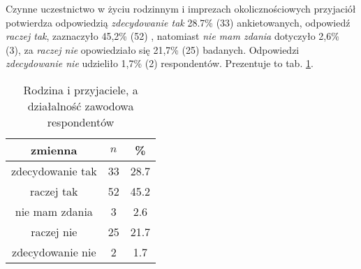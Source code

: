 
Czynne uczestnictwo w życiu rodzinnym i imprezach okolicznościowych przyjaciół potwierdza odpowiedzią \textit{zdecydowanie tak}  28.7\%   (33) ankietowanych, odpowiedź \textit{raczej tak},  zaznaczyło 45,2\% (52) , natomiast \textit{nie mam zdania} dotyczyło 2,6\% (3), za \textit{raczej nie} opowiedziało się  21,7\% (25) badanych. Odpowiedzi \textit{zdecydowanie nie} udzieliło 1,7\% (2) respondentów. Prezentuje to tab.  \ref{tab:Q24}.
\begin{table}[H]
\caption{Rodzina i przyjaciele, a działalność zawodowa respondentów}
\centering
\begin{tabular}{ | c | c | c |}
\hline
zmienna & $n$ & \% \\
\hline
zdecydowanie tak  &  33  & 28.7 \\
\hline
raczej tak  &  52  & 45.2\\
\hline
nie mam zdania  &  3  & 2.6\\
\hline
raczej nie  &  25  & 21.7\\
\hline
zdecydowanie nie  &  2  & 1.7 \\
\hline
\end{tabular}
\label{tab:Q24}
\end{table}
